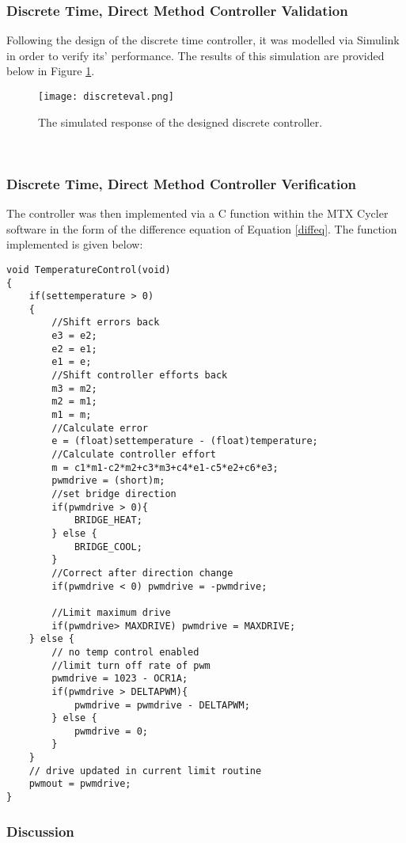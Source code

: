 \subsubsection{Discrete Time, Direct Method Controller Validation}

Following the design of the discrete time controller, it was modelled via Simulink in order to verify its' performance. The results of this simulation are provided below in Figure \ref{fig:discreteval}.

\begin{figure}[!htb]
	\centering
	\texttt{[image: discreteval.png]}
	\caption[Discrete Controller Simulation.]{The simulated response of the designed discrete controller.}
	\label{fig:discreteval}
\end{figure} 
\FloatBarrier

\subsubsection{Discrete Time, Direct Method Controller Verification}

The controller was then implemented via a C function within the MTX Cycler software in the form of the difference equation of Equation \ref{diffeq}. The function implemented is given below:

\begin{lstlisting}
void TemperatureControl(void)
{
	if(settemperature > 0)
	{
		//Shift errors back
		e3 = e2;
		e2 = e1;
		e1 = e;
		//Shift controller efforts back
		m3 = m2;
		m2 = m1;
		m1 = m;
		//Calculate error
		e = (float)settemperature - (float)temperature;
		//Calculate controller effort
		m = c1*m1-c2*m2+c3*m3+c4*e1-c5*e2+c6*e3;
		pwmdrive = (short)m;
		//set bridge direction
		if(pwmdrive > 0){
			BRIDGE_HEAT;
		} else {
			BRIDGE_COOL;
		}
		//Correct after direction change
		if(pwmdrive < 0) pwmdrive = -pwmdrive;
		
		//Limit maximum drive
		if(pwmdrive> MAXDRIVE) pwmdrive = MAXDRIVE;
	} else {
		// no temp control enabled	
		//limit turn off rate of pwm	  
		pwmdrive = 1023 - OCR1A;
		if(pwmdrive > DELTAPWM){
			pwmdrive = pwmdrive - DELTAPWM;
		} else {
			pwmdrive = 0;	
		}
	}
	// drive updated in current limit routine
	pwmout = pwmdrive;	
}
\end{lstlisting}

\subsubsection{Discussion}


